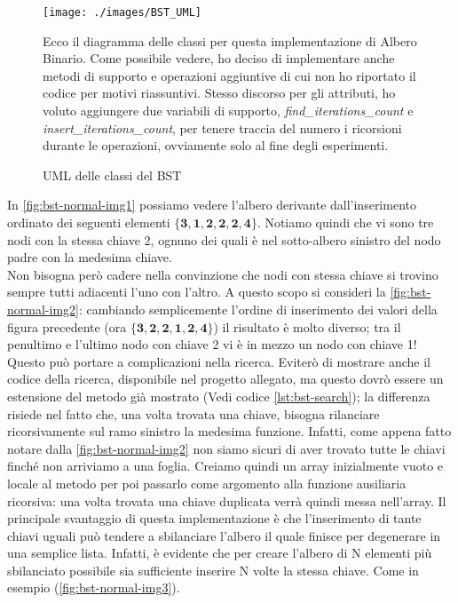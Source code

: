 \documentclass{article}
\begin{document}
\begin{figure}[htbp]
  \begin{minipage}{0.5\textwidth}
    \centering
    \texttt{[image: ./images/BST\_UML]}
    \caption{UML delle classi del BST}
    \label{fig:BST_UML}
  \end{minipage}%
    \hspace{\columnsep}
      \hspace{\columnsep}
  \begin{minipage}{0.5\textwidth}
Ecco il diagramma delle classi per questa implementazione di Albero Binario. Come possibile vedere, ho deciso di implementare anche metodi di supporto e operazioni aggiuntive di cui non ho riportato il codice per motivi riassuntivi.
Stesso discorso per gli attributi, ho voluto aggiungere due variabili di supporto, \textit{find\_iterations\_count} e    \textit{insert\_iterations\_count}, per tenere traccia del numero i ricorsioni durante le operazioni, ovviamente solo al fine degli esperimenti.
  \end{minipage}
\end{figure}




In \cref{fig:bst-normal-img1} possiamo vedere l'albero derivante dall'inserimento ordinato dei seguenti elementi \(\mathbf{\{3, 1, 2, 2, 2, 4\}}\). Notiamo quindi che vi sono tre nodi con la stessa chiave 2, ognuno dei quali è nel sotto-albero sinistro del nodo padre con la medesima chiave.
\\
Non bisogna però cadere nella convinzione che nodi con stessa chiave si trovino sempre tutti adiacenti l'uno con l'altro.
A questo scopo si consideri la \cref{fig:bst-normal-img2}:  cambiando semplicemente l'ordine di inserimento dei valori della figura precedente (ora \(\mathbf{\{3, 2, 2, 1, 2, 4\}}\)) il risultato è molto diverso; tra il penultimo e l'ultimo nodo con chiave 2 vi è in mezzo un nodo con chiave 1!
Questo può portare a complicazioni nella ricerca.
Eviterò di mostrare anche il codice della ricerca, disponibile nel progetto allegato, ma questo dovrò essere un estensione del metodo già mostrato (Vedi codice \ref{lst:bst-search}); la differenza risiede nel fatto che, una volta trovata una chiave, bisogna rilanciare ricorsivamente sul ramo sinistro la medesima funzione. Infatti, come appena fatto notare dalla \cref{fig:bst-normal-img2} non siamo sicuri di aver trovato tutte le chiavi finché non arriviamo a una foglia. Creiamo quindi un array inizialmente vuoto e locale al metodo per poi passarlo come argomento alla funzione ausiliaria ricorsiva: una volta trovata una chiave duplicata verrà quindi messa nell'array. 
Il principale svantaggio di questa implementazione è che l'inserimento di tante chiavi uguali può tendere a sbilanciare l'albero il quale finisce per degenerare in una semplice lista. Infatti, è evidente che per creare l'albero di N elementi più sbilanciato possibile sia sufficiente inserire N volte la stessa chiave. Come in esempio (\cref{fig:bst-normal-img3}).
\end{document}
